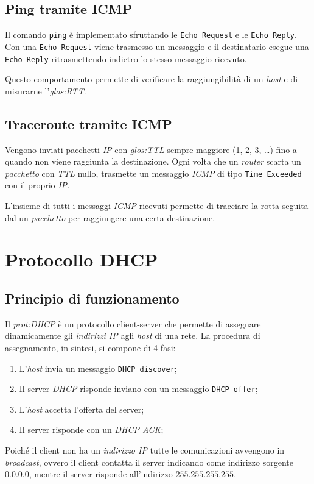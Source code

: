\subsection{Ping tramite ICMP}
Il comando \texttt{ping} è implementato sfruttando le \texttt{Echo Request} e le
\texttt{Echo Reply}. Con una \texttt{Echo Request} viene trasmesso un messaggio e
il destinatario esegue una \texttt{Echo Reply} ritrasmettendo indietro lo stesso
messaggio ricevuto.

Questo comportamento permette di verificare la raggiungibilità di un \emph{host}
e di misurarne l'\emph{\gls{glos:RTT}}.

\subsection{Traceroute tramite ICMP}
Vengono inviati pacchetti \emph{IP} con \emph{\gls{glos:TTL}} sempre maggiore
(1, 2, 3, \dots) fino a quando non viene raggiunta la destinazione. Ogni volta
che un \emph{router} scarta un \emph{pacchetto} con \emph{TTL} nullo, trasmette un
messaggio \emph{ICMP} di tipo \texttt{Time Exceeded} con il proprio \emph{IP}.

L'insieme di tutti i messaggi \emph{ICMP} ricevuti permette di tracciare la rotta
seguita dal un \emph{pacchetto} per raggiungere una certa destinazione.

\section{Protocollo DHCP}
\subsection{Principio di funzionamento}
Il \emph{\gls{prot:DHCP}} è un protocollo client-server che permette di assegnare
dinamicamente gli \emph{indirizzi IP} agli \emph{host} di una rete. La procedura
di assegnamento, in sintesi, si compone di 4 fasi:
\begin{enumerate}
    \item L'\emph{host} invia un messaggio \texttt{DHCP discover};
    \item Il server \emph{DHCP} risponde inviano con un messaggio \texttt{DHCP
    offer};
    \item L'\emph{host} accetta l'offerta del server;
    \item Il server risponde con un \emph{DHCP ACK};
\end{enumerate}
Poiché il client non ha un \emph{indirizzo IP} tutte le comunicazioni avvengono
in \emph{broadcast}, ovvero il client contatta il server indicando come
indirizzo sorgente $0.0.0.0$, mentre il server risponde all'indirizzo $255.255.255.255$.

